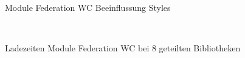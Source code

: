 \begin{figure}[hbt!]
	\centering
	\begin{minipage}[t]{0.65\textwidth}	
		\caption{Module Federation WC Beeinflussung Styles}
		\\ %
		\label{fig:EvalMFWCBeeinflussungStyles}
	\end{minipage}
\end{figure}

\newpage
\begin{figure}[hbt!]
	\centering
	\begin{minipage}[t]{0.65\textwidth}	
		\caption{Ladezeiten Module Federation WC bei 8 geteilten Bibliotheken}
		\\ %
		\label{fig:EvalMFWCLadezeit}
	\end{minipage}
\end{figure}

